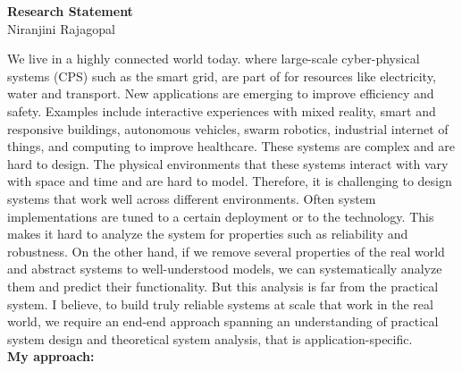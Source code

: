\documentclass[10pt]{article}
\date{}
\begin{document}
\begin{center}
{\LARGE \bf Research Statement}\\
\vspace*{0.1cm}
{\normalsize Niranjini Rajagopal}
\end{center}




We live in a highly connected world today.  where large-scale cyber-physical systems (CPS) such as the smart grid, are part of for resources like electricity, water and transport. New applications are emerging to improve efficiency and safety. Examples include interactive experiences with mixed reality, smart and responsive buildings, autonomous vehicles, swarm robotics, industrial internet of things, and computing to improve healthcare. These systems are complex and are hard to design. The physical environments that these systems interact with vary with space and time and are hard to model. Therefore, it is challenging to design systems that work well across different environments. Often system implementations are tuned to a certain deployment or to the technology. This makes it hard to analyze the system for properties such as reliability and robustness. On the other hand, if we remove several properties of the real world and abstract systems to well-understood models, we can systematically analyze them and predict their functionality. But this analysis is far from the practical system. I believe,  to build truly reliable systems at scale that work in the real world, we require an end-end approach spanning an understanding of practical system design and theoretical system analysis, that is application-specific.\\


\textbf{My approach:}\\
\end{document}
